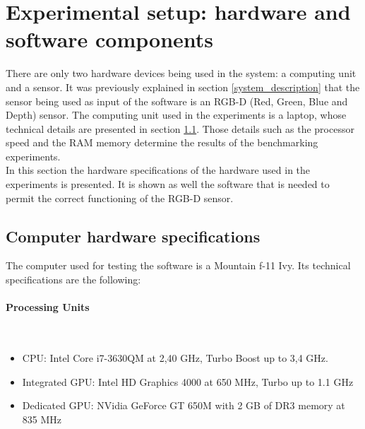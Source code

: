 \section{Experimental setup: hardware and software components}
There are only two hardware devices being used in the system: a computing unit and a sensor. 
It was previously explained in section \ref{system_description} that the sensor being used as input of the software is an RGB-D (Red, Green, Blue and Depth) sensor. 
The computing unit used in the experiments is a laptop, whose technical details are presented in section \ref{computer}. 
Those details such as the processor speed and the RAM memory determine the results of the benchmarking experiments. 
\\

In this section the hardware specifications of the hardware used in the experiments is presented. 
It is shown as well the software that is needed to permit the correct functioning of the RGB-D sensor.



\subsection{Computer hardware specifications}
\label{computer}
	The computer used for testing the software is a Mountain f-11 Ivy. %
	Its technical specifications are the following: 




	\paragraph{Processing Units} \mbox{}\\
		\begin{itemize}
			\item{CPU: Intel Core i7-3630QM at 2,40 GHz, Turbo Boost up to 3,4 GHz.}
			\item{Integrated GPU:  Intel HD Graphics 4000 at 650 MHz,  Turbo up to 1.1 GHz }
			\item{Dedicated GPU: NVidia GeForce GT 650M with 2 GB of DR3 memory at 835 MHz }
		\end{itemize}

